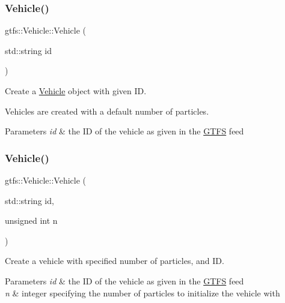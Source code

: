 \subsubsection{\texorpdfstring{Vehicle()}{Vehicle()}\hspace{0.1cm}{\footnotesize\ttfamily [1/2]}}
{\footnotesize\ttfamily gtfs\+::\+Vehicle\+::\+Vehicle (\begin{DoxyParamCaption}\item[{std\+::string}]{id }\end{DoxyParamCaption})}

Create a \hyperlink{classgtfs_1_1Vehicle}{Vehicle} object with given ID.

Vehicles are created with a default number of particles.


\begin{DoxyParams}{Parameters}
{\em id} & the ID of the vehicle as given in the \hyperlink{classgtfs_1_1GTFS}{G\+T\+FS} feed \\
\hline
\end{DoxyParams}
\mbox{\label{classgtfs_1_1Vehicle_adf892e71483b7f9005846599fd0308e6}} 
\subsubsection{\texorpdfstring{Vehicle()}{Vehicle()}\hspace{0.1cm}{\footnotesize\ttfamily [2/2]}}
{\footnotesize\ttfamily gtfs\+::\+Vehicle\+::\+Vehicle (\begin{DoxyParamCaption}\item[{std\+::string}]{id,  }\item[{unsigned int}]{n }\end{DoxyParamCaption})}

Create a vehicle with specified number of particles, and ID.


\begin{DoxyParams}{Parameters}
{\em id} & the ID of the vehicle as given in the \hyperlink{classgtfs_1_1GTFS}{G\+T\+FS} feed \\
\hline
{\em n} & integer specifying the number of particles to initialize the vehicle with \\
\hline
\end{DoxyParams}
\mbox{\label{classgtfs_1_1Vehicle_a08c7450dd0df9406f78b30be044d27d8}} 
